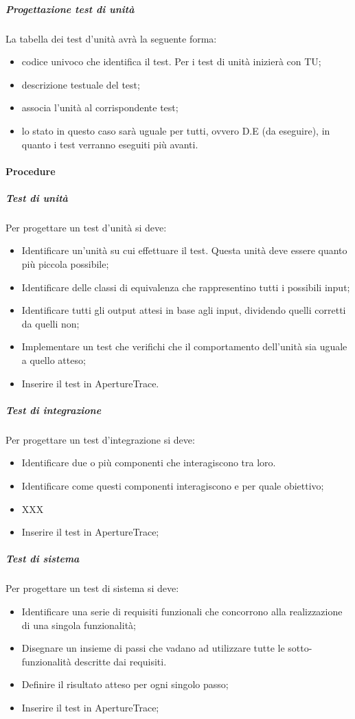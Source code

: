 \subparagraph{Progettazione test di unità}
La tabella dei test d'unità avrà la seguente forma:
\begin{itemize}
\item {}codice univoco che identifica il test. Per i test di unità inizierà con TU;
\item {} descrizione testuale del test;
\item {} associa l'unità al corrispondente test;
\item {}lo stato in questo caso sarà uguale per tutti, ovvero D.E (da eseguire), in quanto i test verranno eseguiti più avanti.
\end{itemize}

\paragraph{Procedure}

\subparagraph{Test di unità}
Per progettare un test d'unità si deve:
\begin{itemize}
\item Identificare un'unità su cui effettuare il test. Questa unità deve essere quanto più piccola possibile;
\item Identificare delle classi di equivalenza che rappresentino tutti i possibili input;
\item Identificare tutti gli output attesi in base agli input, dividendo quelli corretti da quelli non;
\item Implementare un test che verifichi che il comportamento dell'unità sia uguale a quello atteso;
\item Inserire il test in ApertureTrace.
\end{itemize}

\subparagraph{Test di integrazione}
Per progettare un test d'integrazione si deve:
\begin{itemize}
\item Identificare due o più componenti che interagiscono tra loro.
\item Identificare come questi componenti interagiscono e per quale obiettivo;
\item XXX
\item Inserire il test in ApertureTrace;
\end{itemize}

\subparagraph{Test di sistema}
Per progettare un test di sistema si deve:
\begin{itemize}
\item Identificare una serie di requisiti funzionali che concorrono alla realizzazione di una singola funzionalità;
\item Disegnare un insieme di passi che vadano ad utilizzare tutte le sotto-funzionalità descritte dai requisiti.
\item Definire il risultato atteso per ogni singolo passo;
\item Inserire il test in ApertureTrace;
\end{itemize}

